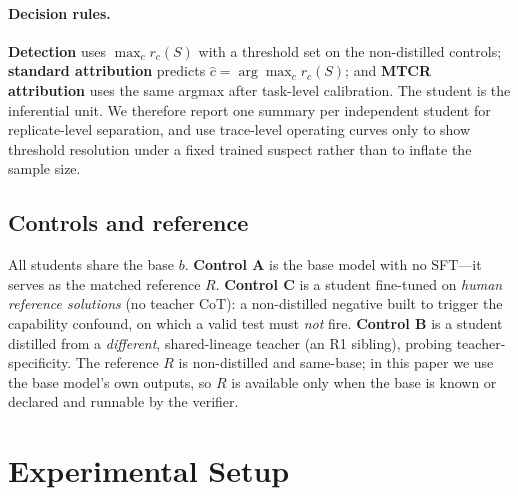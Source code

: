\documentclass[journal]{IEEEtran}
\begin{document}
\paragraph{Decision rules.}
\textbf{Detection} uses $\max_c r_c(S)$ with a threshold set on the non-distilled
controls; \textbf{standard attribution} predicts $\hat c=\arg\max_c r_c(S)$; and
\textbf{MTCR attribution} uses the same argmax after task-level calibration. The
student is the inferential unit. We therefore report one summary per independent
student for replicate-level separation, and use trace-level operating curves only to
show threshold resolution under a fixed trained suspect rather than to inflate the
sample size.

\subsection{Controls and reference}
\label{sec:method:controls}
All students share the base $b$. \textbf{Control A} is the base model with no SFT---it
serves as the matched reference $R$. \textbf{Control C} is a student fine-tuned on
\emph{human reference solutions} (no teacher CoT): a non-distilled negative built to
trigger the capability confound, on which a valid test must \emph{not} fire.
\textbf{Control B} is a student distilled from a \emph{different}, shared-lineage
teacher (an R1 sibling), probing teacher-specificity. The reference $R$ is non-distilled
and same-base; in this paper we use the base model's own outputs, so $R$ is available
only when the base is known or declared and runnable by the verifier.

\section{Experimental Setup}
\label{sec:setup}
\end{document}
